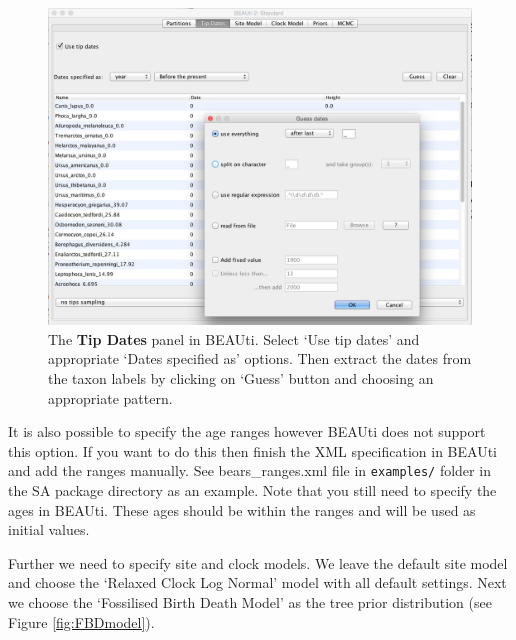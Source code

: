 \documentclass[12pt]{article}
\begin{document}
\begin{figure}	
\centering
\includegraphics[width=\textwidth]{figures/TipDates}
\caption{The {\bf Tip Dates} panel in BEAUti. Select `Use tip dates' and appropriate `Dates specified as' options. Then extract the dates from the taxon labels by clicking on `Guess' button and choosing an appropriate pattern.\label{fig:tipDates}}
\label{fig:BEAUti_ImportNexus}
\end{figure}
It is also possible to specify the age ranges however BEAUti does not support this option. If you want to do this then finish the XML specification in BEAUti and add the ranges manually.  See bears\_ranges.xml file in {\tt examples/} folder in the SA package directory as an example. Note that you still need to specify the ages in BEAUti. These ages should be within the ranges and will be used as initial values. 

Further we need to specify site and clock models. We leave the default site model and choose the `Relaxed Clock Log Normal' model with all default settings. Next we choose the `Fossilised Birth Death Model' as the tree prior distribution (see Figure \ref{fig:FBDmodel}).
\end{document}
